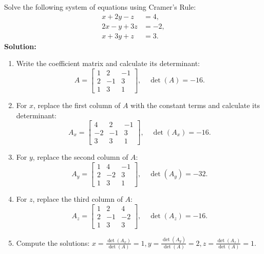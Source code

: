 \documentclass[8pt, a4paper, landscape]{extarticle}
\begin{document}
\begin{multicols*}{4}
  Solve the following system of equations using Cramer's Rule:
  \begin{equation}
    \begin{aligned}
      x + 2y - z  & = 4,  \\
      2x - y + 3z & = -2, \\
      x + 3y + z  & = 3.
    \end{aligned}
  \end{equation}
  \textbf{Solution:}
  \begin{enumerate}
    \item Write the coefficient matrix and calculate its determinant:
          \[
            A = \begin{bmatrix}
              1 & 2  & -1 \\
              2 & -1 & 3  \\
              1 & 3  & 1
            \end{bmatrix}, \quad \det(A) = -16.
          \]
    \item For $x$, replace the first column of $A$ with the constant terms and calculate its determinant:
          \[
            A_x = \begin{bmatrix}
              4  & 2  & -1 \\
              -2 & -1 & 3  \\
              3  & 3  & 1
            \end{bmatrix}, \quad \det(A_x) = -16.
          \]
    \item For $y$, replace the second column of $A$:
          \[
            A_y = \begin{bmatrix}
              1 & 4  & -1 \\
              2 & -2 & 3  \\
              1 & 3  & 1
            \end{bmatrix}, \quad \det(A_y) = -32.
          \]
    \item For $z$, replace the third column of $A$:
          \[
            A_z = \begin{bmatrix}
              1 & 2  & 4  \\
              2 & -1 & -2 \\
              1 & 3  & 3
            \end{bmatrix}, \quad \det(A_z) = -16.
          \]
    \item Compute the solutions: $x = \frac{\det(A_x)}{\det(A)} = 1, y = \frac{\det(A_y)}{\det(A)} = 2, z = \frac{\det(A_z)}{\det(A)} = 1$.
  \end{enumerate}




\end{multicols*}
\end{document}
